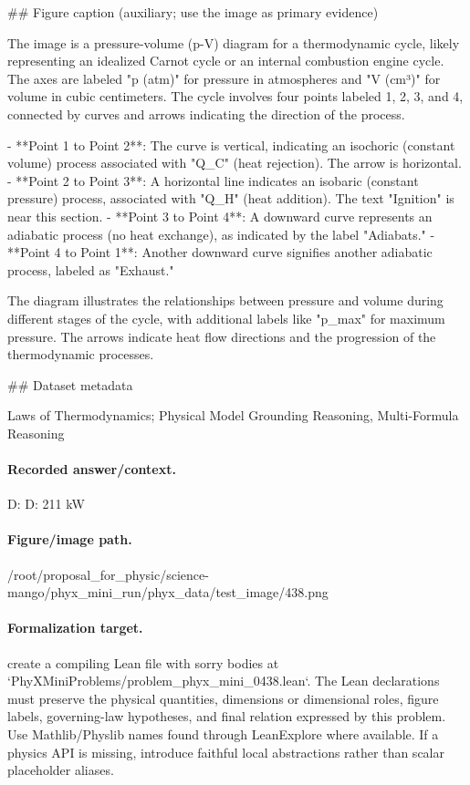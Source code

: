 \#\# Figure caption (auxiliary; use the image as primary evidence)

The image is a pressure-volume (p-V) diagram for a thermodynamic cycle, likely representing an idealized Carnot cycle or an internal combustion engine cycle. The axes are labeled "p (atm)" for pressure in atmospheres and "V (cm³)" for volume in cubic centimeters. The cycle involves four points labeled 1, 2, 3, and 4, connected by curves and arrows indicating the direction of the process.

- **Point 1 to Point 2**: The curve is vertical, indicating an isochoric (constant volume) process associated with "Q\_C" (heat rejection). The arrow is horizontal.
- **Point 2 to Point 3**: A horizontal line indicates an isobaric (constant pressure) process, associated with "Q\_H" (heat addition). The text "Ignition" is near this section.
- **Point 3 to Point 4**: A downward curve represents an adiabatic process (no heat exchange), as indicated by the label "Adiabats."
- **Point 4 to Point 1**: Another downward curve signifies another adiabatic process, labeled as "Exhaust."

The diagram illustrates the relationships between pressure and volume during different stages of the cycle, with additional labels like "p\_max" for maximum pressure. The arrows indicate heat flow directions and the progression of the thermodynamic processes.

\#\# Dataset metadata

Laws of Thermodynamics; Physical Model Grounding Reasoning, Multi-Formula Reasoning

\paragraph{Recorded answer/context.}
D: D: 211 kW

\paragraph{Figure/image path.}
/root/proposal\_for\_physic/science-mango/phyx\_mini\_run/phyx\_data/test\_image/438.png

\paragraph{Formalization target.}
create a compiling Lean file with sorry bodies at `PhyXMiniProblems/problem\_phyx\_mini\_0438.lean`. The Lean declarations must preserve the physical quantities, dimensions or dimensional roles, figure labels, governing-law hypotheses, and final relation expressed by this problem.
Use Mathlib/Physlib names found through LeanExplore where available. If a physics API is missing, introduce faithful local abstractions rather than scalar placeholder aliases.

